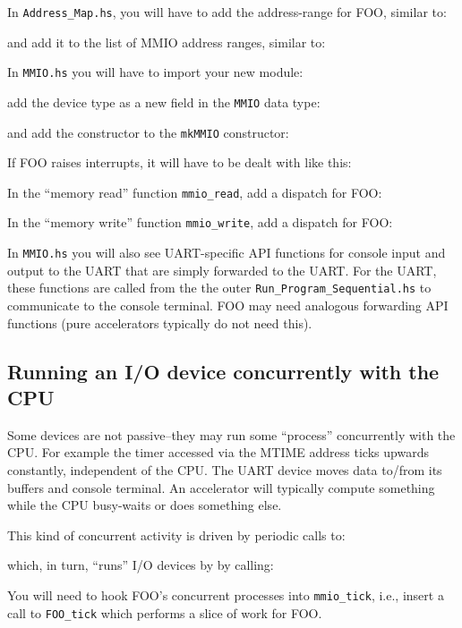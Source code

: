 \documentclass[11pt]{article}
\begin{document}
In \verb|Address_Map.hs|, you will have to add the address-range for
FOO, similar to:



and add it to the list of MMIO address ranges, similar to:



In \verb|MMIO.hs| you will have to import your new module:



add the device type as a new field in the \verb|MMIO| data type:



and add the constructor to the \verb|mkMMIO| constructor:



If FOO raises interrupts, it will have to be dealt with like this:



In the ``memory read'' function \verb|mmio_read|, add a dispatch for FOO:



In the ``memory write'' function \verb|mmio_write|, add a dispatch for FOO:



In \verb|MMIO.hs| you will also see UART-specific API functions for
console input and output to the UART that are simply forwarded to the
UART.  For the UART, these functions are called from the the outer
\verb|Run_Program_Sequential.hs| to communicate to the console
terminal.  FOO may need analogous forwarding API functions (pure
accelerators typically do not need this).


\subsection{Running an I/O device concurrently with the CPU}

Some devices are not passive--they may run some ``process''
concurrently with the CPU.  For example the timer accessed via the
MTIME address ticks upwards constantly, independent of the CPU.  The
UART device moves data to/from its buffers and console terminal.  An
accelerator will typically compute something while the CPU busy-waits
or does something else.

This kind of concurrent activity is driven by periodic calls to:



which, in turn, ``runs'' I/O devices by by calling:



You will need to hook FOO's concurrent processes into
\verb|mmio_tick|, i.e., insert a call to \verb|FOO_tick| which
performs a slice of work for FOO.

\end{document}
